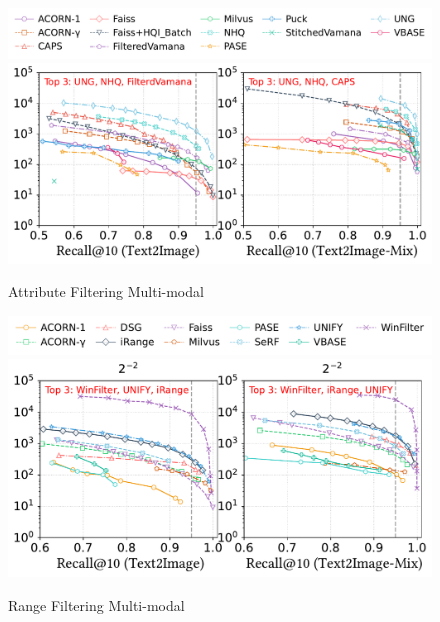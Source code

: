 \documentclass[sigconf, nonacm]{acmart}
\begin{document}
\begin{figure}[htbp]
	\centering
	\includegraphics[width=0.95\linewidth]{fig/attribute_legend.pdf}
	\includegraphics[width=\linewidth]{fig/attribute_multimodel_2.pdf}
	\caption{Attribute Filtering Multi-modal}
	\label{fig:attribute_multimodel}
\end{figure}

\begin{figure}[htbp]
	\centering
	\includegraphics[width=0.95\linewidth]{fig/range_legend.pdf}
	\includegraphics[width=\linewidth]{fig/range_multimodel_2.pdf}
	\caption{Range Filtering Multi-modal}
	\label{fig:range_multimodel}
\end{figure}
\end{document}
